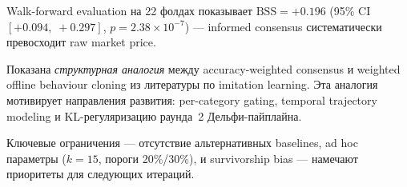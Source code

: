 \documentclass[a4paper, 11pt]{article}
\newcommand{\bss}{\mathrm{BSS}}
\begin{document}
Walk-forward evaluation на 22 фолдах показывает $\bss = +0.196$
(95\% CI $[+0.094,\; +0.297]$, $p = 2.38 \times 10^{-7}$) ---
informed consensus систематически превосходит raw market price.

Показана \emph{структурная аналогия} между accuracy-weighted
consensus и weighted offline behaviour cloning из литературы
по imitation learning.
Эта аналогия мотивирует направления развития:
per-category gating, temporal trajectory modeling
и KL-регуляризацию раунда~2 Дельфи-пайплайна.

Ключевые ограничения --- отсутствие альтернативных baselines,
ad hoc параметры ($k = 15$, пороги 20\%/30\%),
и survivorship bias --- намечают приоритеты для следующих итераций.

\end{document}
